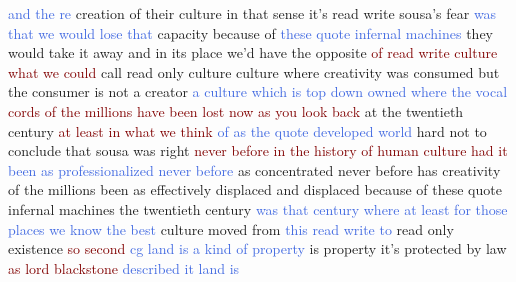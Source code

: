 \textcolor{RoyalBlue}{and} \textcolor{RoyalBlue}{the} \textcolor{RoyalBlue}{re} creation of their culture in that sense it's read write sousa's fear \textcolor{RoyalBlue}{was} \textcolor{RoyalBlue}{that} \textcolor{RoyalBlue}{we} \textcolor{RoyalBlue}{would} \textcolor{RoyalBlue}{lose} \textcolor{RoyalBlue}{that} capacity because of \textcolor{RoyalBlue}{these} \textcolor{RoyalBlue}{quote} \textcolor{RoyalBlue}{infernal} \textcolor{RoyalBlue}{machines} they would take it away and in its place we'd have the opposite \textcolor{Maroon}{of} \textcolor{Maroon}{read} \textcolor{Maroon}{write} \textcolor{Maroon}{culture} \textcolor{Maroon}{what} \textcolor{Maroon}{we} \textcolor{Maroon}{could} call read only culture culture where creativity was consumed but the consumer is not a creator \textcolor{RoyalBlue}{a} \textcolor{RoyalBlue}{culture} \textcolor{RoyalBlue}{which} \textcolor{RoyalBlue}{is} \textcolor{RoyalBlue}{top} \textcolor{RoyalBlue}{down} \textcolor{RoyalBlue}{owned} \textcolor{RoyalBlue}{where} \textcolor{RoyalBlue}{the} \textcolor{RoyalBlue}{vocal} \textcolor{Maroon}{cords} \textcolor{Maroon}{of} \textcolor{Maroon}{the} \textcolor{Maroon}{millions} \textcolor{Maroon}{have} \textcolor{Maroon}{been} \textcolor{Maroon}{lost} \textcolor{Maroon}{now} \textcolor{Maroon}{as} \textcolor{Maroon}{you} \textcolor{Maroon}{look} \textcolor{Maroon}{back} at the twentieth century \textcolor{Maroon}{at} \textcolor{Maroon}{least} \textcolor{Maroon}{in} \textcolor{Maroon}{what} \textcolor{Maroon}{we} \textcolor{Maroon}{think} \textcolor{RoyalBlue}{of} \textcolor{RoyalBlue}{as} \textcolor{RoyalBlue}{the} \textcolor{RoyalBlue}{quote} \textcolor{RoyalBlue}{developed} \textcolor{RoyalBlue}{world} hard not to conclude that sousa was right \textcolor{Maroon}{never} \textcolor{Maroon}{before} \textcolor{Maroon}{in} \textcolor{Maroon}{the} \textcolor{Maroon}{history} \textcolor{Maroon}{of} \textcolor{Maroon}{human} \textcolor{Maroon}{culture} \textcolor{Maroon}{had} \textcolor{Maroon}{it} \textcolor{RoyalBlue}{been} \textcolor{RoyalBlue}{as} \textcolor{RoyalBlue}{professionalized} \textcolor{RoyalBlue}{never} \textcolor{RoyalBlue}{before} as concentrated never before has creativity of the millions been as effectively displaced and displaced because of these quote infernal machines the twentieth century \textcolor{RoyalBlue}{was} \textcolor{RoyalBlue}{that} \textcolor{RoyalBlue}{century} \textcolor{RoyalBlue}{where} \textcolor{RoyalBlue}{at} \textcolor{RoyalBlue}{least} \textcolor{RoyalBlue}{for} \textcolor{RoyalBlue}{those} \textcolor{RoyalBlue}{places} \textcolor{RoyalBlue}{we} \textcolor{RoyalBlue}{know} \textcolor{RoyalBlue}{the} \textcolor{RoyalBlue}{best} culture moved from \textcolor{RoyalBlue}{this} \textcolor{RoyalBlue}{read} \textcolor{RoyalBlue}{write} \textcolor{RoyalBlue}{to} read only existence \textcolor{Maroon}{so} \textcolor{Maroon}{second} \textcolor{RoyalBlue}{{cg}} \textcolor{RoyalBlue}{land} \textcolor{RoyalBlue}{is} \textcolor{RoyalBlue}{a} \textcolor{RoyalBlue}{kind} \textcolor{RoyalBlue}{of} \textcolor{RoyalBlue}{property} is property it's protected by law \textcolor{Maroon}{as} \textcolor{Maroon}{lord} \textcolor{Maroon}{blackstone} \textcolor{RoyalBlue}{described} \textcolor{RoyalBlue}{it} \textcolor{RoyalBlue}{land} \textcolor{RoyalBlue}{is} 